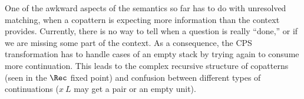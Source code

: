 \documentclass[sigplan,screen]{acmart}
\begin{document}



One of the awkward aspects of the semantics so far has to do with unresolved
matching, when a copattern is expecting more information than the context
provides.  Currently, there is no way to tell when a question is really
``done,'' or if we are missing some part of the context.  As a consequence, the
CPS transformation has to handle cases of an empty stack by trying again to
consume more continuation.  This leads to the complex recursive structure of
copatterns (seen in the $\Rec$ fixed point) and confusion between different
types of continuations (\eg $x~L$ may get a pair or an empty unit).
\end{document}
